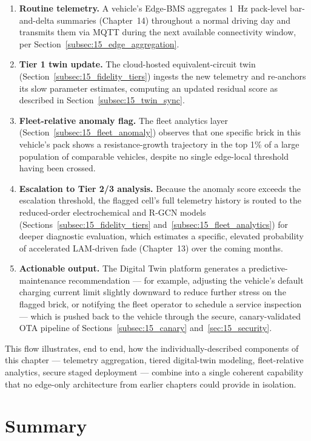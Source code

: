 \begin{enumerate}
    \item \textbf{Routine telemetry.} A vehicle's Edge-BMS aggregates 1~Hz pack-level bar-and-delta summaries (Chapter~14) throughout a normal driving day and transmits them via MQTT during the next available connectivity window, per Section~\ref{subsec:15_edge_aggregation}.
    \item \textbf{Tier 1 twin update.} The cloud-hosted equivalent-circuit twin (Section~\ref{subsec:15_fidelity_tiers}) ingests the new telemetry and re-anchors its slow parameter estimates, computing an updated residual score as described in Section~\ref{subsec:15_twin_sync}.
    \item \textbf{Fleet-relative anomaly flag.} The fleet analytics layer (Section~\ref{subsec:15_fleet_anomaly}) observes that one specific brick in this vehicle's pack shows a resistance-growth trajectory in the top 1\% of a large population of comparable vehicles, despite no single edge-local threshold having been crossed.
    \item \textbf{Escalation to Tier 2/3 analysis.} Because the anomaly score exceeds the escalation threshold, the flagged cell's full telemetry history is routed to the reduced-order electrochemical and R-GCN models (Sections~\ref{subsec:15_fidelity_tiers} and~\ref{subsec:15_fleet_analytics}) for deeper diagnostic evaluation, which estimates a specific, elevated probability of accelerated LAM-driven fade (Chapter~13) over the coming months.
    \item \textbf{Actionable output.} The Digital Twin platform generates a predictive-maintenance recommendation — for example, adjusting the vehicle's default charging current limit slightly downward to reduce further stress on the flagged brick, or notifying the fleet operator to schedule a service inspection — which is pushed back to the vehicle through the secure, canary-validated OTA pipeline of Sections~\ref{subsec:15_canary} and~\ref{sec:15_security}.
\end{enumerate}

This flow illustrates, end to end, how the individually-described components of this chapter — telemetry aggregation, tiered digital-twin modeling, fleet-relative analytics, secure staged deployment — combine into a single coherent capability that no edge-only architecture from earlier chapters could provide in isolation.

\section{Summary}
\label{sec:15_summary}

